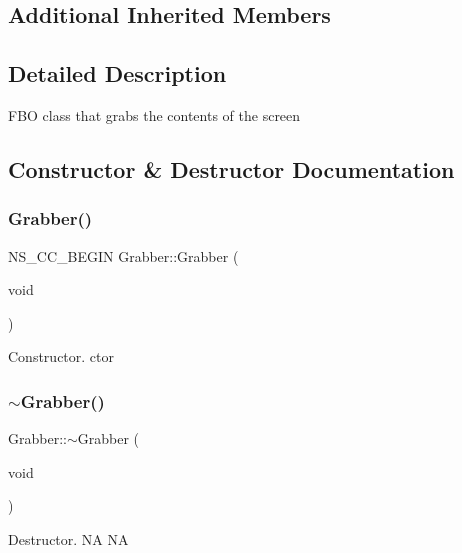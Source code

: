 \subsection*{Additional Inherited Members}


\subsection{Detailed Description}
F\+BO class that grabs the contents of the screen 

\subsection{Constructor \& Destructor Documentation}
\mbox{\label{classGrabber_a5bc904ccb8d712452e793f9339a0616f}} 
\subsubsection{\texorpdfstring{Grabber()}{Grabber()}\hspace{0.1cm}{\footnotesize\ttfamily [1/2]}}
{\footnotesize\ttfamily N\+S\+\_\+\+C\+C\+\_\+\+B\+E\+G\+IN Grabber\+::\+Grabber (\begin{DoxyParamCaption}\item[{void}]{ }\end{DoxyParamCaption})}

Constructor.  ctor \mbox{\label{classGrabber_af101dcd8d526aa14315c3f9bbd580b5a}} 
\subsubsection{\texorpdfstring{$\sim$\+Grabber()}{~Grabber()}\hspace{0.1cm}{\footnotesize\ttfamily [1/2]}}
{\footnotesize\ttfamily Grabber\+::$\sim$\+Grabber (\begin{DoxyParamCaption}\item[{void}]{ }\end{DoxyParamCaption})}

Destructor.  NA  NA \mbox{\label{classGrabber_afbe4643baa9a73654b6eeaa8195b177d}} 
